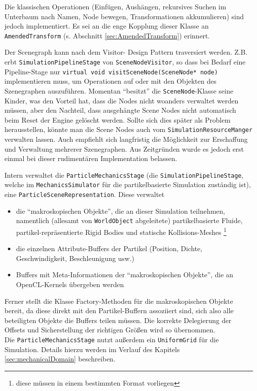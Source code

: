 	Die klassischen Operationen (Einfügen, Aushängen, rekursives Suchen im Unterbaum nach Namen, Node bewegen,
	Transformationen akkumulieren) sind jedoch implementiert. Es sei an die enge Kopplung dieser Klasse an
	\lstinline|AmendedTransform| (s. Abschnitt \ref{sec:AmendedTransform}) erinnert.
	
	Der Scenegraph kann nach dem Visitor- Design Pattern traversiert werden. Z.B. erbt 
	\lstinline|SimulationPipelineStage| von \lstinline|SceneNodeVisitor|, so dass bei Bedarf eine Pipeline-Stage
	nur \lstinline|virtual void visitSceneNode(SceneNode* node)| implementieren muss, um Operationen auf oder mit
	den Objekten des Szenegraphen auszuführen.
	Momentan "`besitzt"' die \lstinline|SceneNode|-Klasse seine Kinder, was den Vorteil hat, dass die Nodes nicht woanders
	verwaltet werden müssen, aber den Nachteil, dass ausgehängte Scene Nodes nicht automatisch beim Reset der Engine
	gelöscht werden. Sollte sich dies später als Problem herausstellen, könnte man die Scene Nodes auch vom
	\lstinline|SimulationResourceManger| verwalten lassen.
	Auch empfiehlt sich langfristig die Möglichkeit zur Erschaffung und Verwaltung mehrerer Szenegraphen.
	Aus Zeitgründen wurde es jedoch erst einmal bei dieser rudimentären Implementation belassen.
	
	Intern verwaltet die \lstinline|ParticleMechanicsStage| (die  \linebreak \lstinline|SimulationPipelineStage|,
	welche im \lstinline|MechanicsSimulator| für die partikelbasierte Simulation zuständig ist), 
	eine \lstinline|ParticleSceneRepresentation|. Diese verwaltet 
	\begin{itemize}
		\item die "`makroskopischen Objekte"', die an dieser Simulation teilnehmen,
		namentlich (allesamt von \lstinline|WorldObject| abgeleitete) 
		partikelbasierte Fluide, partikel-repräsentierte Rigid Bodies und statische Kollisions-Meshes
		\footnote{diese müssen in einem bestimmten Format vorliegen}
		\item die einzelnen Attribute-Buffers der Partikel
			(Position, Dichte, Geschwindigkeit, Beschleunigung usw.)
		\item Buffers mit Meta-Informationen der "`makroskopischen Objekte"', die an OpenCL-Kernels übergeben werden
	\end{itemize}
	Ferner stellt die Klasse Factory-Methoden für die makroskopischen Objekte bereit, da diese direkt mit den
	Partikel-Buffern assoziiert sind, sich also alle beteiligten Objekte die Buffers teilen müssen. Die korrekte
	Delegierung der Offsets und Sicherstellung der richtigen Größen wird so übernommen.\\
	Die \lstinline|ParticleMechanicsStage| nutzt außerdem ein \lstinline|UniformGrid| für die Simulation.
	Details hierzu werden im Verlauf des Kapitels \ref{sec:mechanicalDomain} beschreiben.
	
